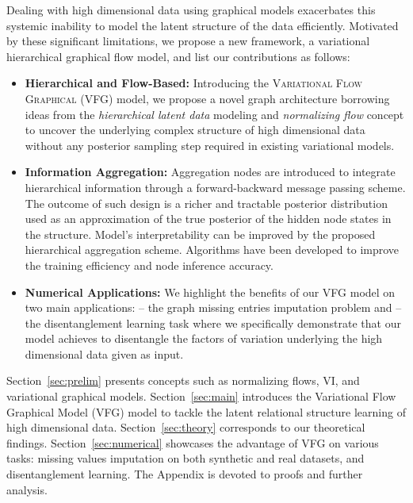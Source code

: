 \documentclass[twoside]{article}
\begin{document}
Dealing with high dimensional data using graphical models exacerbates this systemic inability to model the latent structure of the data efficiently.
Motivated by these significant limitations, we propose a new framework, a variational hierarchical graphical flow model, and list our contributions as follows:
\begin{itemize}
    \item \textbf{Hierarchical and Flow-Based:} Introducing the \textsc{Variational Flow Graphical (VFG)} model, we propose a novel graph architecture borrowing ideas from the \emph{hierarchical latent data} modeling and \emph{normalizing flow} concept to uncover the underlying complex structure of high dimensional data without any posterior sampling step required in existing variational models. 
    
    \item \textbf{Information Aggregation:} Aggregation nodes are introduced to integrate hierarchical information through a forward-backward message passing scheme.  
          The outcome of such design is a richer and tractable posterior distribution used as an approximation of the true posterior of the hidden node states in the structure. Model's interpretability can be improved by the proposed hierarchical aggregation scheme. Algorithms have been developed to improve the training efficiency and node inference accuracy.    

    \item \textbf{Numerical Applications:} We highlight the benefits of our VFG model on two main applications: \textsc{--} the graph missing entries imputation problem and \textsc{--} the disentanglement learning task where we specifically demonstrate that our model achieves to disentangle the factors of variation underlying the high dimensional data given as input.
\end{itemize}

Section~\ref{sec:prelim} presents concepts such as normalizing flows, VI, and variational graphical models.
Section~\ref{sec:main} introduces the Variational Flow Graphical Model (VFG) model to tackle the latent relational structure learning of high dimensional data.
Section~\ref{sec:theory} corresponds to our theoretical findings.
Section~\ref{sec:numerical} showcases the advantage of VFG on various tasks: missing values imputation on both synthetic and real datasets, and disentanglement learning.
The Appendix is devoted to proofs and further analysis. 
\end{document}
